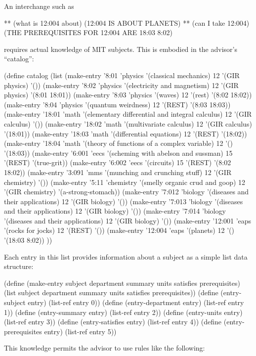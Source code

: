 An interchange such as

\beginlisp
** (what is 12:004 about)
(12:004 IS ABOUT PLANETS)
** (can I take 12:004)
(THE PREREQUISITES FOR 12:004 ARE 18:03 8:02)
\endlisp

\noindent
requires actual knowledge of MIT subjects.  This is embodied in the
advisor's ``catalog'':

\beginlisp
(define catalog
  (list
   (make-entry '8:01 'physics '(classical mechanics) 12 '(GIR physics) '())
   (make-entry '8:02 'physics '(electricity and magnetism) 12 '(GIR physics) '(8:01 18:01))
   (make-entry '8:03 'physics '(waves) 12 '(rest) '(8:02 18:02))
   (make-entry '8:04 'physics '(quantum weirdness) 12 '(REST) '(8:03 18:03))
   (make-entry '18:01 'math '(elementary differential and integral calculus) 12 '(GIR calculus) '())
   (make-entry '18:02 'math '(multivariate calculus) 12 '(GIR calculus) '(18:01))
   (make-entry '18:03 'math '(differential equations) 12 '(REST) '(18:02))
   (make-entry '18:04 'math '(theory of functions of a complex variable) 12 '() '(18:03))
   (make-entry '6:001 'eecs '(scheming with abelson and sussman) 15 '(REST) '(true-grit))
   (make-entry '6:002 'eecs '(circuits) 15 '(REST) '(8:02 18:02))
   (make-entry '3:091 'mms '(munching and crunching stuff) 12 '(GIR chemistry) '())
   (make-entry '5:11 'chemistry '(smelly organic crud and goop) 12 '(GIR chemistry) '(a-strong-stomach))
   (make-entry '7:012 'biology '(diseases and their applications) 12 '(GIR biology) '())
   (make-entry '7:013 'biology '(diseases and their applications) 12 '(GIR biology) '())
   (make-entry '7:014 'biology '(diseases and their applications) 12 '(GIR biology) '())
   (make-entry '12:001 'eaps '(rocks for jocks) 12 '(REST) '())
   (make-entry '12:004 'eaps '(planets) 12 '() '(18:03 8:02)) ))
\endlisp

\noindent
Each entry in this list provides information about a subject as a
simple list data structure:

\beginlisp
(define (make-entry subject department summary units satisfies prerequisites)
  (list subject department summary units satisfies prerequisites))
\null
(define (entry-subject entry) (list-ref entry 0))
(define (entry-department entry) (list-ref entry 1))
(define (entry-summary entry) (list-ref entry 2))
(define (entry-units entry) (list-ref entry 3))
(define (entry-satisfies entry) (list-ref entry 4))
(define (entry-prerequisites entry) (list-ref entry 5))
\endlisp

This knowledge permits the advisor to use rules like the following:

